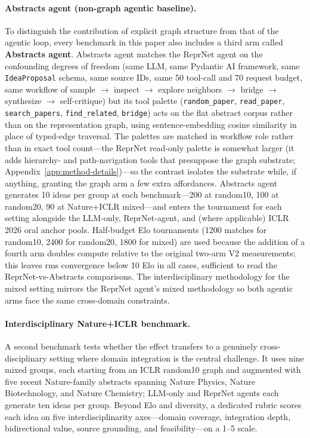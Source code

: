 \documentclass[10pt,twocolumn]{article}
\begin{document}
\paragraph{Abstracts agent (non-graph agentic baseline).}
To distinguish the contribution of explicit graph structure from that
of the agentic loop, every benchmark in this paper also includes a
third arm called \textbf{Abstracts agent}.  Abstracts agent matches the
ReprNet agent on the confounding degrees of freedom (same LLM, same
Pydantic AI framework, same
\texttt{IdeaProposal} schema, same source IDs, same 50 tool-call and
70 request budget, same workflow of sample $\to$ inspect $\to$ explore
neighbors $\to$ bridge $\to$ synthesize $\to$ self-critique) but its
tool palette (\texttt{random\_paper}, \texttt{read\_paper},
\texttt{search\_papers}, \texttt{find\_related}, \texttt{bridge}) acts
on the flat abstract corpus rather than on the representation graph,
using sentence-embedding cosine similarity in place of typed-edge
traversal.  The palettes are matched in workflow role rather than in
exact tool count---the ReprNet read-only palette is somewhat larger
(it adds hierarchy- and path-navigation tools that presuppose the
graph substrate; Appendix~\ref{app:method-details})---so the contrast
isolates the substrate while, if anything, granting the graph arm a
few extra affordances.  Abstracts agent generates 10 ideas per group at each
benchmark---200 at random10, 100 at random20, 90 at Nature+ICLR
mixed---and enters the tournament for each setting alongside the
LLM-only, ReprNet-agent, and (where applicable) ICLR 2026 oral anchor pools.
Half-budget Elo tournaments (1200 matches for random10, 2400 for
random20, 1800 for mixed) are used because the addition of a fourth
arm doubles compute relative to the original two-arm V2 measurements;
this leaves rms convergence below 10 Elo in all cases, sufficient to
read the ReprNet-vs-Abstracts comparisons.  The interdisciplinary
methodology for the mixed setting mirrors the ReprNet agent's mixed
methodology so both agentic arms face the same cross-domain
constraints.

\paragraph{Interdisciplinary Nature+ICLR benchmark.}
A second benchmark tests whether the effect transfers to a genuinely
cross-disciplinary setting where domain integration is the central
challenge.  It uses nine mixed groups, each starting from an ICLR
random10 graph and augmented with five recent Nature-family abstracts
spanning Nature Physics, Nature Biotechnology, and Nature Chemistry;
LLM-only and ReprNet agents each generate ten ideas per group.  Beyond Elo
and diversity, a dedicated rubric scores each idea on five
interdisciplinarity axes---domain coverage, integration depth,
bidirectional value, source grounding, and feasibility---on a 1--5
scale.
\end{document}
